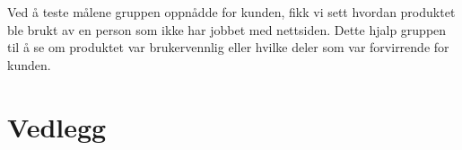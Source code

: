 \documentclass[12pt,a4paper,norsk]{article}
\begin{document}
Ved å teste målene gruppen oppnådde for kunden, fikk vi sett hvordan produktet ble brukt av en person som ikke har jobbet med nettsiden. Dette hjalp gruppen til å se om produktet var brukervennlig eller hvilke deler som var forvirrende for kunden. 

\newpage
{}
{}


\section{Vedlegg}

\end{document}
